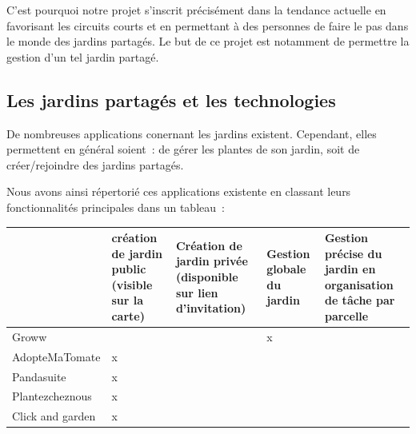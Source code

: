 \documentclass[french,a4paper]{article}
\begin{document}
C’est pourquoi notre projet s’inscrit précisément dans la tendance actuelle en favorisant les circuits courts et en permettant à des personnes de faire le pas dans le monde des jardins partagés. Le but de ce projet est notamment de  permettre la gestion d’un tel jardin partagé.

\subsection{Les jardins partagés et les technologies}
De nombreuses applications conernant les jardins existent. 
Cependant, elles permettent en général soient~: de gérer les plantes de son jardin, soit de créer/rejoindre des jardins partagés.

Nous avons ainsi répertorié ces applications existente en classant leurs fonctionnalités principales dans un tableau~:

\begin{center}
    \begin{tabular}{ |l| p{3cm} | p{3cm} | p{3cm} | p{3cm} | }
        \hline
                         & \raggedright création de jardin public (visible sur la carte) & \raggedright Création de jardin privée (disponible sur lien d’invitation) & \raggedright Gestion globale du jardin & Gestion précise du jardin en organisation de tâche par parcelle \\
        \hline
        Groww            &                                                              &                                                                            & x                                      &                                                                 \\
        \hline
        AdopteMaTomate   & x                                                            &                                                                            &                                        &                                                                 \\
        \hline
        Pandasuite       & x                                                            &                                                                            &                                        &                                                                 \\
        \hline
        Plantezcheznous  & x                                                            &                                                                            &                                        &                                                                 \\
        \hline
        Click and garden & x                                                            &                                                                            &                                        &                                                                 \\

        \hline
    \end{tabular}
\end{center}
\end{document}
